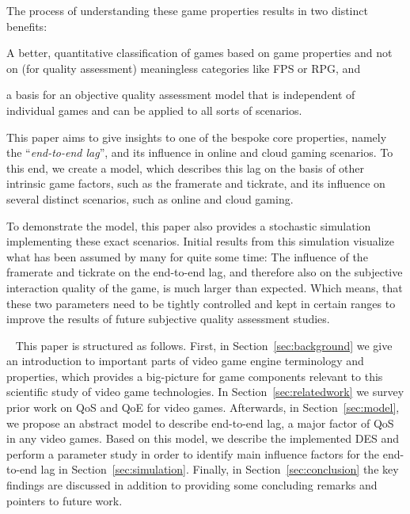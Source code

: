 The process of understanding these game properties results in two distinct benefits:
\begin{enumerate*}
	\item A better, quantitative classification of games based on game properties and not on (for quality assessment) meaningless categories like \gls{FPS} or \gls{RPG}, and
	\item a basis for an objective quality assessment model that is independent of individual games and can be applied to all sorts of scenarios.
\end{enumerate*}

This paper aims to give insights to one of the bespoke core properties, namely the ``\textit{end-to-end lag}'', and its influence in online and cloud gaming scenarios. To this end, we create a model, which describes this lag on the basis of other intrinsic game factors, such as the framerate and tickrate, and its influence on several distinct scenarios, such as online and cloud gaming.

To demonstrate the model, this paper also provides a stochastic simulation implementing these exact scenarios. Initial results from this simulation visualize what has been assumed by many for quite some time: The influence of the framerate and tickrate on the end-to-end lag, and therefore also on the subjective interaction quality of the game, is much larger than expected. Which means, that these two parameters need to be tightly controlled and kept in certain ranges to improve the results of future subjective quality assessment studies.

~\newline
This paper is structured as follows.
First, in Section~\ref{sec:background} we give an introduction to important parts of video game engine terminology and properties, which provides a big-picture for game components relevant to this scientific study of video game technologies.
In Section~\ref{sec:relatedwork} we survey prior work on \gls{QoS} and \gls{QoE} for video games.
Afterwards, in Section~\ref{sec:model}, we propose an abstract model to describe end-to-end lag, a major factor of \gls{QoS} in any video games. Based on this model, we describe the implemented \gls{DES} and perform a parameter study in order to identify main influence factors for the end-to-end lag in Section~\ref{sec:simulation}. Finally, in Section~\ref{sec:conclusion} the key findings are discussed in addition to providing some concluding remarks and pointers to future work.

